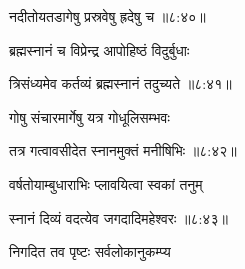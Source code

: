 
{\devanagarifont नदीतोयतडागेषु प्रस्रवेषु ह्रदेषु च {॥८:४०॥} \veg\dontdisplaylinenum }%



{\devanagarifont ब्रह्मस्नानं च विप्रेन्द्र आपोहिष्ठं विदुर्बुधाः \thinspace{\dandab} \dontdisplaylinenum }%


{\devanagarifont त्रिसंध्यमेव कर्तव्यं ब्रह्मस्नानं तदुच्यते {॥८:४१॥} \veg\dontdisplaylinenum }%
 


{\devanagarifont गोषु संचारमार्गेषु यत्र गोधूलिसम्भवः \thinspace{\dandab} \dontdisplaylinenum }%
 

{\devanagarifont तत्र गत्वावसीदेत स्नानमुक्तं मनीषिभिः {॥८:४२॥} \veg\dontdisplaylinenum }%



{\devanagarifont वर्षतोयाम्बुधाराभिः प्लावयित्वा स्वकां तनुम् \thinspace{\dandab} \dontdisplaylinenum }%


{\devanagarifont स्नानं दिव्यं वदत्येव जगदादिमहेश्वरः {॥८:४३॥} \veg\dontdisplaylinenum }%

\ujvers{}    %


\nemslokab

{\devanagarifont निगदित तव पृष्टः सर्वलोकानुकम्प्य  \danda\dontdisplaylinenum }%

